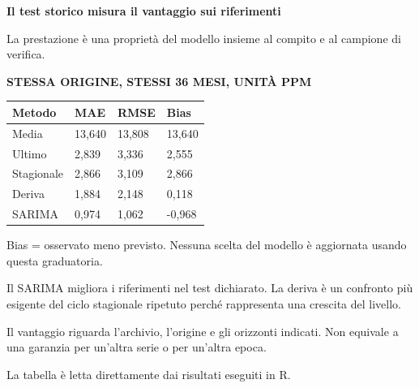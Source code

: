\documentclass[12pt,aspectratio=1610]{beamer}
\newcommand{\PLabel}[1]{\par{\color{Classical}\bfseries\fontsize{9}{11}\selectfont\MakeUppercase{#1}}\par\vspace{1.8mm}}
\newcommand{\PBody}[1]{\par{\fontsize{11.3}{14.8}\selectfont #1\par}}
\newcommand{\PSmall}[1]{\par{\fontsize{9.8}{13.1}\selectfont #1\par}}
\newcommand{\PInfo}[1]{%
\begin{tcolorbox}[enhanced,arc=1.6mm,boxrule=.55pt,colback=GeoTint,
 colframe=Rule!80!Classical,left=2.3mm,right=2.3mm,top=2mm,bottom=2mm,
 before skip=1mm,after skip=1mm]
\PSmall{#1}\end{tcolorbox}}
\begin{document}
\begin{frame}[plain]\hypertarget{slide85}{}
\begin{lrbox}{\TitleBox}
\begin{minipage}[t]{17.7cm}\raggedright\color{Ink}\fontsize{11.3}{14.8}\selectfont
\color{Navy}\bfseries\fontsize{20.6}{24.5}\selectfont Il test storico misura il vantaggio sui riferimenti
\end{minipage}\end{lrbox}

\begin{lrbox}{\RecallBox}
\begin{minipage}[t]{14.3cm}\raggedright\color{Ink}\fontsize{11.3}{14.8}\selectfont
\fontsize{10.3}{13.8}\selectfont La prestazione è una proprietà del modello insieme al compito e al campione di verifica.
\end{minipage}\end{lrbox}

\begin{lrbox}{\PilotLeftBox}
\begin{minipage}[t]{10.05cm}\raggedright\color{Ink}\fontsize{11.3}{14.8}\selectfont
\PLabel{Stessa origine, stessi 36 mesi, unità ppm}
{\fontsize{10.2}{13.1}\selectfont\renewcommand{\arraystretch}{1.45}\begin{tabular}{@{}p{2.0835cm}p{2.0835cm}p{2.0835cm}p{2.0835cm}@{}}\toprule
\textbf{Metodo} & \textbf{MAE} & \textbf{RMSE} & \textbf{Bias}\\\midrule
Media & 13,640 & 13,808 & 13,640\\
Ultimo & 2,839 & 3,336 & 2,555\\
Stagionale & 2,866 & 3,109 & 2,866\\
Deriva & 1,884 & 2,148 & 0,118\\
SARIMA & 0,974 & 1,062 & -0,968\\
\bottomrule\end{tabular}}
\PSmall{Bias = osservato meno previsto. Nessuna scelta del modello è aggiornata usando questa graduatoria.}

\end{minipage}\end{lrbox}

\begin{lrbox}{\PilotRightBox}
\begin{minipage}[t]{7.55cm}\raggedright\color{Ink}\fontsize{11.3}{14.8}\selectfont
\PBody{Il SARIMA migliora i riferimenti nel test dichiarato. La deriva è un confronto più esigente del ciclo stagionale ripetuto perché rappresenta una crescita del livello.}
\vspace{2.5mm}
\PInfo{Il vantaggio riguarda l’archivio, l’origine e gli orizzonti indicati. Non equivale a una garanzia per un’altra serie o per un’altra epoca.}
\PSmall{La tabella è letta direttamente dai risultati eseguiti in R.}


\end{minipage}
\end{lrbox}
\end{frame}
\end{document}
